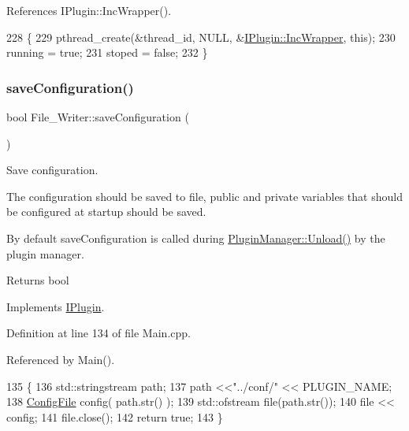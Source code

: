 References I\+Plugin\+::\+Inc\+Wrapper().


\begin{DoxyCode}
228 \{
229     pthread\_create(&thread\_id, NULL, &\hyperlink{class_i_plugin_a62d22be2fdf66eb7f5c2f797f5f3d7f3}{IPlugin::IncWrapper}, \textcolor{keyword}{this});
230     running = \textcolor{keyword}{true};
231     stoped = \textcolor{keyword}{false};
232 \}
\end{DoxyCode}
\mbox{\label{class_file___writer_a6561b234c4ce33315aa5931463a1cb20}} 
\subsubsection{\texorpdfstring{save\+Configuration()}{saveConfiguration()}}
{\footnotesize\ttfamily bool File\+\_\+\+Writer\+::save\+Configuration (\begin{DoxyParamCaption}{ }\end{DoxyParamCaption})\hspace{0.3cm}{\ttfamily [virtual]}}



Save configuration. 

The configuration should be saved to file, public and private variables that should be configured at startup should be saved.

By default save\+Configuration is called during \hyperlink{class_plugin_manager_ab651a05d6fcb92562807e9f5ecc30855}{Plugin\+Manager\+::\+Unload()} by the plugin manager.

\begin{DoxyReturn}{Returns}
bool 
\end{DoxyReturn}


Implements \hyperlink{class_i_plugin_a79b5c42b1c7b08257a6110b2091039bc}{I\+Plugin}.



Definition at line 134 of file Main.\+cpp.



Referenced by Main().


\begin{DoxyCode}
135 \{
136     std::stringstream path;
137     path <<\textcolor{stringliteral}{"../conf/"} << PLUGIN\_NAME;
138     \hyperlink{class_config_file}{ConfigFile} config( path.str() );
139     std::ofstream file(path.str());
140     file << config;
141     file.close();
142     \textcolor{keywordflow}{return} \textcolor{keyword}{true};
143 \}
\end{DoxyCode}
\mbox{\label{class_file___writer_ad420a007be3af0efd8ea76bac66e2cb0}} 
